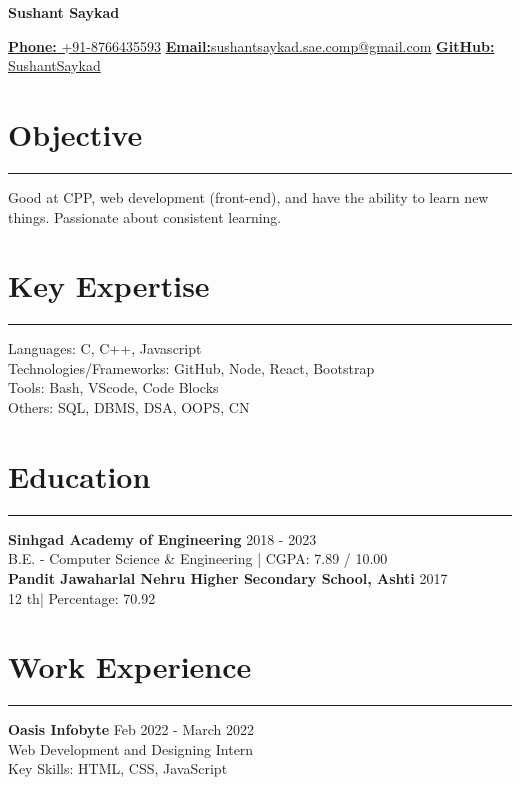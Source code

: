 \documentclass[a4paper,11pt]{article}
\begin{document}
\begin{center}
\textbf{\Huge Sushant Saykad}\\


\end{center}


\small
\noindent\underline{\textbf{Phone:} +91-8766435593}\hspace{0.2cm} \underline{\textbf{Email:}\href{mailto:sushantsaykad.sae.comp@gmail.com}sushantsaykad.sae.comp@gmail.com} \hspace{0.2cm} \underline{\textbf{GitHub:} \href{https://github.com/SushantSaykad}SushantSaykad}



\section*{Objective}
\vspace{-0.2cm}
\hrule
\vspace{0.2cm}
Good at CPP, web development (front-end), and have the ability to learn new things. Passionate about consistent learning.

\section*{Key Expertise}
\vspace{-0.2cm}
\hrule
\vspace{0.2cm}
Languages: C, C++, Javascript\\
Technologies/Frameworks: GitHub, Node, React, Bootstrap\\
Tools: Bash, VScode, Code Blocks\\
Others: SQL, DBMS, DSA, OOPS, CN

\section*{Education}
\vspace{-0.2cm}
\hrule
\vspace{0.2cm}
\textbf{Sinhgad Academy of Engineering} \hfill 2018 - 2023\\
B.E. - Computer Science \& Engineering | CGPA: 7.89 / 10.00\\
\textbf{Pandit Jawaharlal Nehru Higher Secondary School, Ashti} \hfill 2017\\
12
th| Percentage: 70.92
\section*{Work Experience}
\vspace{-0.2cm}
\hrule
\vspace{0.2cm}
\textbf{Oasis Infobyte} \hfill Feb 2022 - March 2022\\
Web Development and Designing Intern\\
Key Skills: HTML, CSS, JavaScript
\end{document}
